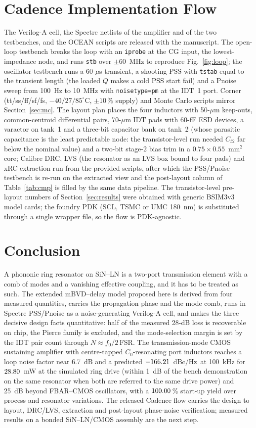 \documentclass[journal]{IEEEtran}
\newcommand{\dBc}{dBc/Hz}
\begin{document}
\section{Cadence Implementation Flow}\label{sec:flow}
The Verilog-A cell, the Spectre netlists of the amplifier and of the two testbenches, and the OCEAN scripts are released with the manuscript. The open-loop testbench breaks the loop with an \texttt{iprobe} at the CG input, the lowest-impedance node, and runs \texttt{stb} over $\pm60$~MHz to reproduce Fig.~\ref{fig:loop}; the oscillator testbench runs a 60-$\mu$s transient, a shooting PSS with \texttt{tstab} equal to the transient length (the loaded $Q$ makes a cold PSS start fail) and a Pnoise sweep from 100~Hz to 10~MHz with \texttt{noisetype=pm} at the IDT~1 port. Corner (tt/ss/ff/sf/fs, $-40/27/85^\circ$C, $\pm10$\,\% supply) and Monte Carlo scripts mirror Section~\ref{sec:mc}. The layout plan places the four inductors with 50-$\mu$m keep-outs, common-centroid differential pairs, 70-$\mu$m IDT pads with 60-fF ESD devices, a varactor on tank~1 and a three-bit capacitor bank on tank~2 (whose parasitic capacitance is the least predictable node: the transistor-level run needed $C_{t2}$ far below the nominal value) and a two-bit stage-2 bias trim in a $0.75\times0.55$~mm$^2$ core; Calibre DRC, LVS (the resonator as an LVS box bound to four pads) and xRC extraction run from the provided scripts, after which the PSS/Pnoise testbench is re-run on the extracted view and the post-layout column of Table~\ref{tab:cmp} is filled by the same data pipeline. The transistor-level pre-layout numbers of Section~\ref{sec:results} were obtained with generic BSIM3v3 model cards; the foundry PDK (SCL, TSMC or UMC 180~nm) is substituted through a single wrapper file, so the flow is PDK-agnostic.

\section{Conclusion}
A phononic ring resonator on SiN--LN is a two-port transmission element with a comb of modes and a vanishing effective coupling, and it has to be treated as such. The extended mBVD--delay model proposed here is derived from four measured quantities, carries the propagation phase and the mode comb, runs in Spectre PSS/Pnoise as a noise-generating Verilog-A cell, and makes the three decisive design facts quantitative: half of the measured 28-dB loss is recoverable on chip, the Pierce family is excluded, and the mode-selection margin is set by the IDT pair count through $N\approx f_0/2\,\mathrm{FSR}$. The transmission-mode CMOS sustaining amplifier with centre-tapped $C_0$-resonating port inductors reaches a loop noise factor near 6.7~dB and a predicted $-166.21$~\dBc\ at 100~kHz for $28.80$~mW at the simulated ring drive (within 1~dB of the bench demonstration on the same resonator when both are referred to the same drive power) and 25~dB beyond FBAR--CMOS oscillators, with a $100.00$\,\% start-up yield over process and resonator variations. The released Cadence flow carries the design to layout, DRC/LVS, extraction and post-layout phase-noise verification; measured results on a bonded SiN--LN/CMOS assembly are the next step.
\end{document}
